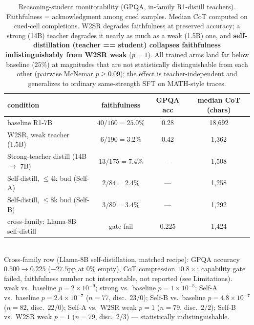 \documentclass[10pt]{article}
\begin{document}
\begin{table}[t]\centering\small
\caption{Reasoning-student monitorability (GPQA, in-family R1-distill teachers).
Faithfulness = acknowledgment among cued samples. Median CoT computed on
cued-cell completions. W2SR degrades faithfulness at preserved accuracy; a strong
(14B) teacher degrades it nearly as much as a weak (1.5B) one, and
\textbf{self-distillation (teacher == student) collapses faithfulness
indistinguishably from W2SR weak} ($p\!=\!1$). All trained arms land far below
baseline ($25\%$) at magnitudes that are not statistically distinguishable from
each other (pairwise McNemar $p\!\ge\!0.09$); the effect is teacher-independent
and generalizes to ordinary same-strength SFT on MATH-style traces.}
\label{tab:r1}
\begin{tabular}{lccc}
\toprule
condition & faithfulness & GPQA acc & median CoT (chars) \\
\midrule
baseline R1-7B & $40/160 = 25.0\%$ & 0.28 & 18{,}692 \\
W2SR, weak teacher (1.5B) & $6/190 = 3.2\%$ & 0.42 & 1{,}362 \\
Strong-teacher distill (14B $\to$ 7B) & $13/175 = 7.4\%$ & --- & 1{,}508 \\
Self-distill, $\le$4k bud (Self-A) & $2/84 = 2.4\%$ & --- & 1{,}258 \\
Self-distill, $\le$8k bud (Self-B) & $3/89 = 3.4\%$ & --- & 1{,}292 \\
\midrule
cross-family: Llama-8B self-distill & gate fail & 0.225 & 1{,}424 \\
\bottomrule
\end{tabular}
\\[1pt]
\footnotesize Cross-family row (Llama-8B self-distillation, matched recipe):
GPQA accuracy $0.500\!\to\!0.225$ ($-27.5$pp at $0\%$ empty), CoT compression
$10.8\times$; capability gate failed, faithfulness number not interpretable, not
reported (see Limitations).
\\[2pt]
\footnotesize weak vs.\ baseline $p\!=\!2\!\times\!10^{-9}$; strong vs.\ baseline
$p\!=\!1\!\times\!10^{-5}$; Self-A vs.\ baseline $p\!=\!2.4\!\times\!10^{-7}$
($n\!=\!77$, disc.\ $23/0$); Self-B vs.\ baseline $p\!=\!4.8\!\times\!10^{-7}$
($n\!=\!82$, disc.\ $22/0$); Self-A vs.\ W2SR weak $p\!=\!1$ ($n\!=\!79$, disc.\ $2/2$);
Self-B vs.\ W2SR weak $p\!=\!1$ ($n\!=\!79$, disc.\ $2/3$) --- statistically indistinguishable.
\end{table}
\end{document}
